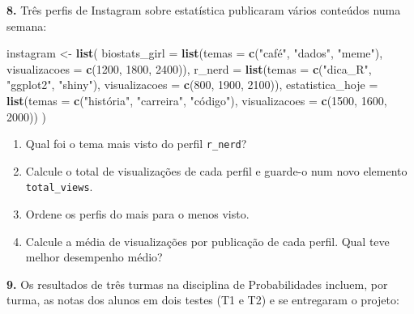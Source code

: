 \documentclass[
  portuguese,
  11pt,
  openany]{book}
\newenvironment{Shaded}{\begin{snugshade}}{\end{snugshade}}
\newcommand{\AttributeTok}[1]{\textcolor[rgb]{0.13,0.29,0.53}{#1}}
\newcommand{\DecValTok}[1]{\textcolor[rgb]{0.00,0.00,0.81}{#1}}
\newcommand{\FunctionTok}[1]{\textcolor[rgb]{0.13,0.29,0.53}{\textbf{#1}}}
\newcommand{\NormalTok}[1]{#1}
\newcommand{\OtherTok}[1]{\textcolor[rgb]{0.56,0.35,0.01}{#1}}
\newcommand{\StringTok}[1]{\textcolor[rgb]{0.31,0.60,0.02}{#1}}
\providecommand{\tightlist}{%
  \setlength{\itemsep}{0pt}\setlength{\parskip}{0pt}}
\begin{document}
\textbf{8.} Três perfis de Instagram sobre estatística publicaram vários conteúdos numa
semana:

\begin{Shaded}
\begin{Highlighting}[]
\NormalTok{instagram }\OtherTok{\textless{}{-}} \FunctionTok{list}\NormalTok{(}
  \AttributeTok{biostats\_girl =} \FunctionTok{list}\NormalTok{(}\AttributeTok{temas =} \FunctionTok{c}\NormalTok{(}\StringTok{"café"}\NormalTok{, }\StringTok{"dados"}\NormalTok{, }\StringTok{"meme"}\NormalTok{),}
                       \AttributeTok{visualizacoes =} \FunctionTok{c}\NormalTok{(}\DecValTok{1200}\NormalTok{, }\DecValTok{1800}\NormalTok{, }\DecValTok{2400}\NormalTok{)),}
  \AttributeTok{r\_nerd =} \FunctionTok{list}\NormalTok{(}\AttributeTok{temas =} \FunctionTok{c}\NormalTok{(}\StringTok{"dica\_R"}\NormalTok{, }\StringTok{"ggplot2"}\NormalTok{, }\StringTok{"shiny"}\NormalTok{),}
                \AttributeTok{visualizacoes =} \FunctionTok{c}\NormalTok{(}\DecValTok{800}\NormalTok{, }\DecValTok{1900}\NormalTok{, }\DecValTok{2100}\NormalTok{)),}
  \AttributeTok{estatistica\_hoje =} \FunctionTok{list}\NormalTok{(}\AttributeTok{temas =} \FunctionTok{c}\NormalTok{(}\StringTok{"história"}\NormalTok{, }\StringTok{"carreira"}\NormalTok{, }\StringTok{"código"}\NormalTok{),}
                          \AttributeTok{visualizacoes =} \FunctionTok{c}\NormalTok{(}\DecValTok{1500}\NormalTok{, }\DecValTok{1600}\NormalTok{, }\DecValTok{2000}\NormalTok{))}
\NormalTok{)}
\end{Highlighting}
\end{Shaded}

\begin{enumerate}
\def\labelenumi{(\alph{enumi})}
\tightlist
\item
  Qual foi o tema mais visto do perfil \texttt{r\_nerd}?
\item
  Calcule o total de visualizações de cada perfil e guarde-o num novo elemento
  \texttt{total\_views}.
\item
  Ordene os perfis do mais para o menos visto.
\item
  Calcule a média de visualizações por publicação de cada perfil. Qual teve
  melhor desempenho médio?
\end{enumerate}

\textbf{9.} Os resultados de três turmas na disciplina de Probabilidades incluem, por
turma, as notas dos alunos em dois testes (T1 e T2) e se entregaram o projeto:
\end{document}
